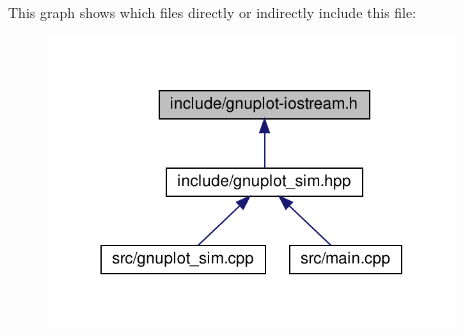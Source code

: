 This graph shows which files directly or indirectly include this file\+:\nopagebreak
\begin{figure}[H]
\begin{center}
\leavevmode
\includegraphics[width=306pt]{gnuplot-iostream_8h__dep__incl}
\end{center}
\end{figure}
